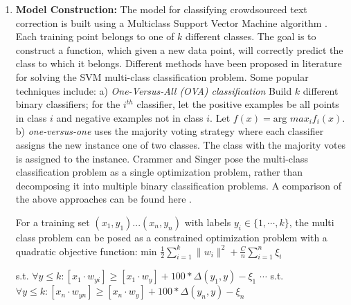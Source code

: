 \documentclass[letterpaper]{article}
\begin{document}
\begin{enumerate}
\item \textbf{Model Construction: } The model for classifying crowdsourced text correction is built using a Multiclass Support Vector Machine algorithm \cite{Tsochantaridis_2004}. Each training point belongs to one of $k$ different classes. The goal is to construct a function, which given a new data point, will correctly predict the class to which it belongs.
Different methods have been proposed in literature for solving the SVM multi-class classification problem. Some popular techniques include: a) \textit{One-Versus-All (OVA) classification} Build $k$ different binary classifiers; for the $i^{th}$ classifier, let the positive examples be all points in class $i$ and negative examples not in class $i$. Let $f(x) = \text{arg } max_i f_i(x) $.  b) \textit{one-versus-one} uses the majority voting strategy where each classifier assigns the new instance one of two classes. The class with the majority votes is assigned to the instance.
Crammer and Singer \cite{crammer} pose the multi-class classification problem as a single optimization problem, rather than decomposing it into multiple binary classification problems. A comparison of the above approaches can be found here \cite{comparison}.

For a training set $(x_1,y_1) ... (x_n,y_n)$ with labels $y_i \in \{1, \cdots, k\}$, the multi class problem can be posed as a constrained optimization problem with a quadratic objective function:
$\text{min } \frac{1}{2} \sum_{i = 1}^{k} \parallel w_{i}\parallel^2 + \frac{C}{n} \sum_{i = 1}^{n}\xi_{i} $

s.t. $\forall y \leq k : [x_{1} \cdot w_{yi}] \geq [x_{1} \cdot w_{y}] + 100*\Delta(y_{1},y)-\xi_{1}$
$\cdots$
s.t. $\forall y \leq k : [x_{n} \cdot w_{yn}] \geq [x_{n} \cdot w_{y}] + 100*\Delta(y_{n},y)-\xi_{n}$


\end{enumerate}
\end{document}
